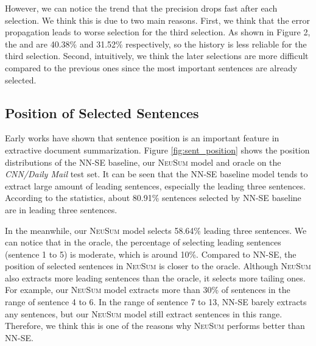 \documentclass[11pt,a4paper]{article}
\newcommand{\ourModelName}{\textsc{NeuSum}}
\newcommand{\cnndm}{\textit{CNN/Daily Mail}}
\begin{document}
However, we can notice the trend that the precision drops fast after each selection.
We think this is due to two main reasons.
First, we think that the error propagation leads to worse selection for the third selection. As shown in Figure 2, the  and  are 40.38\% and 31.52\% respectively, so the history is less reliable for the third selection.
Second, intuitively, we think the later selections are more difficult compared to the previous ones since the most important sentences are already selected.




\subsection{Position of Selected Sentences}


Early works \cite{Ren:2017:LCS:3077136.3080792,nallapati2017summarunner} have shown that sentence position is an important feature in extractive document summarization. 
Figure \ref{fig:sent_position} shows the position distributions of the \textsc{NN-SE} baseline, our \ourModelName{} model and oracle on the \cnndm{} test set.
It can be seen that the \textsc{NN-SE} baseline model tends to extract large amount of leading sentences, especially the leading three sentences.
According to the statistics, about 80.91\% sentences selected by \textsc{NN-SE} baseline are in leading three sentences.

In the meanwhile, our \ourModelName{} model selects 58.64\% leading three sentences.
We can notice that in the oracle, the percentage of selecting leading sentences (sentence 1 to 5) is moderate, which is around 10\%.
Compared to \textsc{NN-SE}, the position of selected sentences in \ourModelName{} is closer to the oracle.
Although \ourModelName{} also extracts more leading sentences than the oracle, it selects more tailing ones.
For example, our \ourModelName{} model extracts more than 30\% of sentences in the range of sentence 4 to 6.
In the range of sentence 7 to 13, \textsc{NN-SE} barely extracts any sentences, but our \ourModelName{} model still extract sentences in this range.
Therefore, we think this is one of the reasons why \ourModelName{} performs better than \textsc{NN-SE}.
\end{document}
